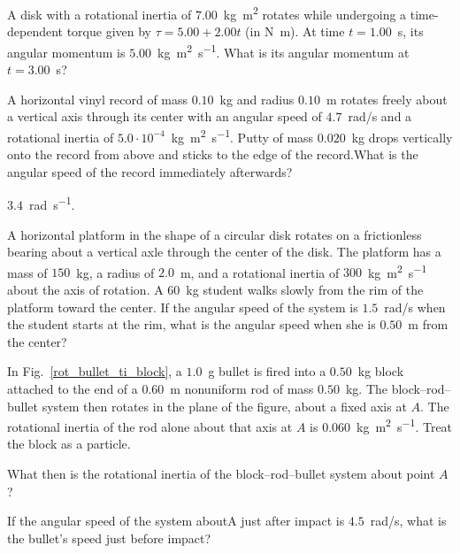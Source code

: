 \begin{problem}
	A disk with a rotational inertia of $7.00$~\si{\kilo\gram\square\meter} rotates while undergoing a time-dependent torque given by $\tau = 5.00 + 2.00 t$ (in \si{\newton\meter}). At time $t = 1.00$~s, its angular momentum is $5.00$~\si{\kilo\gram\square\meter\per\second}. What is its angular momentum at $t = 3.00$~s?
\end{problem}


\begin{problem}
	A horizontal vinyl record of mass $0.10$~kg and radius $0.10$~m rotates freely about a vertical axis through its center with an angular speed of $4.7$~rad/s and a rotational inertia of $5.0 \cdot 10^{-4}$~\si{\kilo\gram\square\meter\per\second}. Putty of mass $0.020$~kg drops vertically onto the record from above and sticks to the edge of the record.What is the angular speed of the record immediately afterwards?
	\begin{solution}
		$3.4$~\si{\radian\per\second}.
	\end{solution}
\end{problem}


\begin{problem}
	A horizontal platform in the shape of a circular disk rotates on a frictionless bearing about a vertical axle through the center of the disk. The platform has a mass of $150$~kg, a radius of $2.0$~m, and a rotational inertia of $300$~\si{\kilo\gram\square\meter\per\second} about the axis of rotation. A $60$~kg student walks slowly from the rim of the platform toward the center. If the angular speed of the system is $1.5$~rad/s when the student starts at the rim, what is the angular speed when she is $0.50$~m from the center?
\end{problem}


\begin{problem}\label{prb:rot_bullet_ti_block}
	In Fig.~\ref{rot_bullet_ti_block}, a $1.0$~g bullet is fired into a $0.50$~kg block attached to the end of a $0.60$~m nonuniform rod of mass $0.50$~kg. The block–rod–bullet system then rotates in the plane of the figure, about a fixed axis at $A$. The rotational inertia of the rod alone about that axis at $A$ is $0.060$~\si{\kilo\gram\square\meter\per\second}. Treat the block as a particle. 
	\begin{enumerate*}[label=(\alph*)]
		\item What then is the rotational inertia of the block–rod–bullet system about point $A$?
		\item If the angular speed of the system about$ $A just after impact is $4.5$~rad/s, what is the bullet’s speed just before impact?
	\end{enumerate*}
\end{problem}


